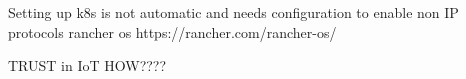Setting up k8s is not automatic and needs configuration to enable non IP protocols
rancher os
https://rancher.com/rancher-os/

TRUST in IoT HOW????